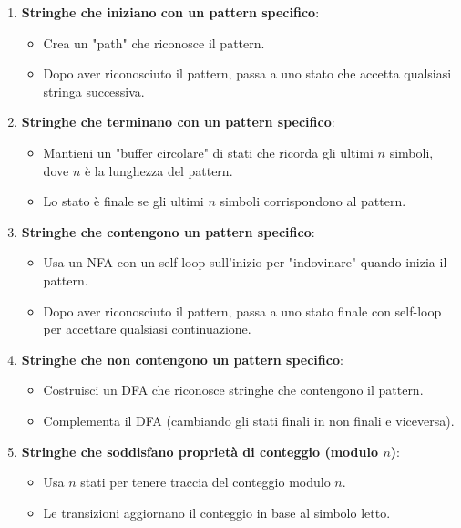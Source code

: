 \documentclass[12pt,a4paper]{article}
\begin{document}
\begin{enumerate}
  \item \textbf{Stringhe che iniziano con un pattern specifico}:
  \begin{itemize}
    \item Crea un "path" che riconosce il pattern.
    \item Dopo aver riconosciuto il pattern, passa a uno stato che accetta qualsiasi stringa successiva.
  \end{itemize}
  
  \item \textbf{Stringhe che terminano con un pattern specifico}:
  \begin{itemize}
    \item Mantieni un "buffer circolare" di stati che ricorda gli ultimi $n$ simboli, dove $n$ è la lunghezza del pattern.
    \item Lo stato è finale se gli ultimi $n$ simboli corrispondono al pattern.
  \end{itemize}
  
  \item \textbf{Stringhe che contengono un pattern specifico}:
  \begin{itemize}
    \item Usa un NFA con un self-loop sull'inizio per "indovinare" quando inizia il pattern.
    \item Dopo aver riconosciuto il pattern, passa a uno stato finale con self-loop per accettare qualsiasi continuazione.
  \end{itemize}
  
  \item \textbf{Stringhe che non contengono un pattern specifico}:
  \begin{itemize}
    \item Costruisci un DFA che riconosce stringhe che contengono il pattern.
    \item Complementa il DFA (cambiando gli stati finali in non finali e viceversa).
  \end{itemize}
  
  \item \textbf{Stringhe che soddisfano proprietà di conteggio (modulo $n$)}:
  \begin{itemize}
    \item Usa $n$ stati per tenere traccia del conteggio modulo $n$.
    \item Le transizioni aggiornano il conteggio in base al simbolo letto.
  \end{itemize}
\end{enumerate}
\end{document}
